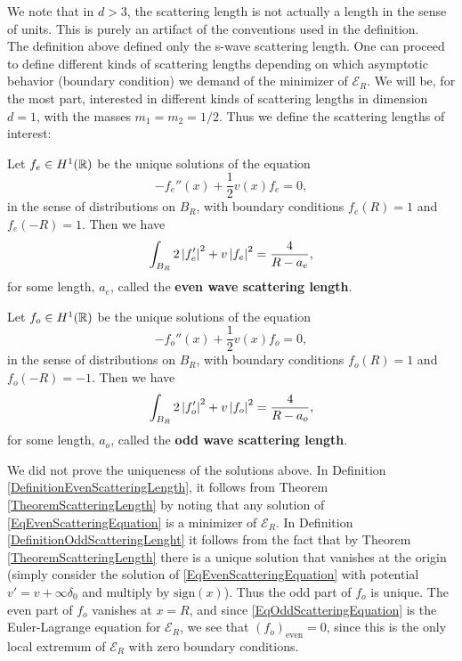 We note that in $ d>3 $, the scattering length is not actually a length in the sense of units. This is purely an artifact of the conventions used in the definition.\\
The definition above defined only the s-wave scattering length. One can proceed to define different kinds of scattering lengths depending on which asymptotic behavior (boundary condition) we demand of the minimizer of $ \mathcal{E}_R $. We will be, for the most part, interested in different kinds of scattering lengths in dimension $ d=1 $, with the masses $ m_1=m_2=1/2 $. Thus we define the scattering lengths of interest:
\begin{definition}\label{DefinitionEvenScatteringLength}
	Let $ f_e\in H^1(\mathbb{R}) $ be the unique solutions of the equation\begin{equation}\label{EqEvenScatteringEquation}
	-f_e''(x)+\frac{1}{2}v(x)f_e=0,
	\end{equation}
	in the sense of distributions on $ B_R $, with boundary conditions $ f_e(R)=1 $ and $ f_e(-R)=1 $. Then we have \begin{equation}
	\int_{B_R} 2\left\lvert f_e' \right\rvert^2+v \left\lvert f_e \right\rvert^2=\frac{4}{R-a_e},
	\end{equation} 
	for some length, $ a_e $, called the \textbf{even wave scattering length}.
\end{definition}
\begin{definition}\label{DefinitionOddScatteringLenght}
	Let $ f_o\in H^1(\mathbb{R}) $ be the unique solutions of the equation\begin{equation}\label{EqOddScatteringEquation}
	-f_o''(x)+\frac{1}{2}v(x)f_o=0,
	\end{equation}
	in the sense of distributions on $ B_R $, with boundary conditions $ f_o(R)=1 $ and $ f_o(-R)=-1 $. Then we have \begin{equation}
	\int_{B_R} 2\left\lvert f_o' \right\rvert^2+v \left\lvert f_o \right\rvert^2=\frac{4}{R-a_o},
	\end{equation} 
	for some length, $ a_o $, called the \textbf{odd wave scattering length}.
\end{definition}
\begin{remark}
	We did not prove the uniqueness of the solutions above. In Definition \ref{DefinitionEvenScatteringLength}, it follows from Theorem \ref{TheoremScatteringLength} by noting that any solution of \eqref{EqEvenScatteringEquation} is a minimizer of $ \mathcal{E}_R $. In Definition \ref{DefinitionOddScatteringLenght} it follows from the fact that by Theorem \ref{TheoremScatteringLength} there is a unique solution that vanishes at the origin (simply consider the solution of \eqref{EqEvenScatteringEquation} with potential $ v'=v+\infty \delta_0 $ and multiply by $ \text{sign}(x) $). Thus the odd part of $ f_o $ is unique. The even part of $ f_o $ vanishes at $ x=R $, and since \eqref{EqOddScatteringEquation} is the Euler-Lagrange equation for $ \mathcal{E}_R $, we see that $ (f_o)_{\text{even}}=0 $, since this is the only local extremum of $ \mathcal{E}_R $ with zero boundary conditions.
\end{remark}
